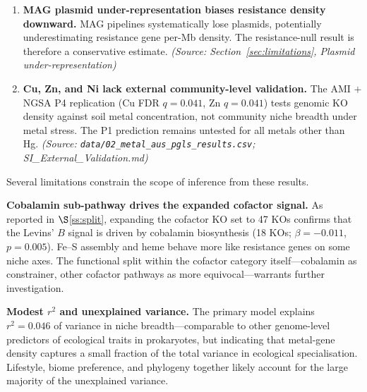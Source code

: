 \documentclass[times]{zHenriquesLab-StyleBioRxiv}
\begin{document}
\begin{enumerate}
\item \textbf{MAG plasmid under-representation biases resistance density downward.}
MAG pipelines systematically lose plasmids, potentially underestimating resistance
gene per-Mb density. The resistance-null result is therefore a conservative estimate.
\textit{(Source: Section~\ref{sec:limitations}, Plasmid under-representation)}

\item \textbf{Cu, Zn, and Ni lack external community-level validation.}
The AMI $+$ NGSA P4 replication (Cu FDR $q = 0.041$, Zn $q = 0.041$)
tests genomic KO density against soil metal concentration, not community niche breadth
under metal stress. The P1 prediction remains untested for all metals other than Hg.
\textit{(Source: \texttt{data/02\_metal\_aus\_pgls\_results.csv}; SI\_External\_Validation.md)}
\end{enumerate}



Several limitations constrain the scope of inference from these results.

\textbf{Cobalamin sub-pathway drives the expanded cofactor signal.}
As reported in $\S$\ref{ss:split}, expanding the cofactor KO set to 47 KOs
confirms that the Levins' $B$ signal is driven by cobalamin biosynthesis
(18 KOs; $\beta = -0.011$, $p = 0.005$). Fe--S assembly and heme behave more
like resistance genes on some niche axes. The functional split within the
cofactor category itself---cobalamin as constrainer, other cofactor pathways
as more equivocal---warrants further investigation.

\textbf{Modest $r^2$ and unexplained variance.} The primary model explains
$r^2 = 0.046$ of variance in niche breadth---comparable to other genome-level
predictors of ecological traits in prokaryotes, but indicating that metal-gene
density captures a small fraction of the total variance in ecological
specialisation. Lifestyle, biome preference, and phylogeny together likely
account for the large majority of the unexplained variance.
\end{document}
